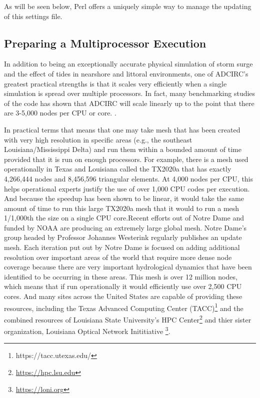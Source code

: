 \documentclass{article}
\begin{document}
As will be seen below, Perl offers a uniquely simple way to manage the updating
of this settings file.

\subsection{Preparing a Multiprocessor Execution}

In addition to being an exceptionally accurate physical simulation of storm
surge and the effect of tides in nearshore and littoral environments, one of
ADCIRC's greatest practical strengths is that it scales very efficiently when a
single simulation is spread over multiple processors. In fact, many benchmarking
studies of the code has shown that ADCIRC will scale linearly up to the point
that there are 3-5,000 nodes per CPU or core. \cite{benchmarks}.

In practical terms that means that one may take mesh that has been created with
very high resolution in specific areas (e.g., the southeast
Louisiana/Mississippi Delta) and run them within a bounded amount of time
provided that it is run on enough processors. For example, there is a mesh used
operationally in Texas and Louisiana called the TX2020a that has exactly
4,266,444 nodes and 8,456,596 triangular elements. At 4,000 nodes per CPU, this
helps operational experts justify the use of over 1,000 CPU codes per execution.
And because the speedup has been shown to be linear, it would take the same
amount of time to run this large TX2020a mesh that it would to run a mesh
1/1,000th the size on a single CPU core.Recent efforts out of Notre Dame and
funded by NOAA are producing an extremely large global
mesh\cite{dietrich2012performance}. Notre Dame's group headed by Professor
Johannes Westerink regularly publishes an update mesh.  Each iteration put out
by Notre Dame is focused on adding additional resolution over important areas of
the world that require more dense node coverage because there are very important
hydrological dynamics that have been identified to be occurring in these areas.
This mesh is over 12 million nodes, which means that if run operationally it
would efficiently use over 2,500 CPU cores. And many sites across the United
States are capable of providing these resources, including the Texas Advanced
Computing Center (TACC)\footnote{{https://tacc.utexas.edu/}} and the combined
resources of Louisiana State University's HPC
Center\footnote{\url{https://hpc.lsu.edu}} and thier sister organization,
Louisiana Optical Network Inititiative \footnote{\url{https://loni.org}}.
\end{document}
